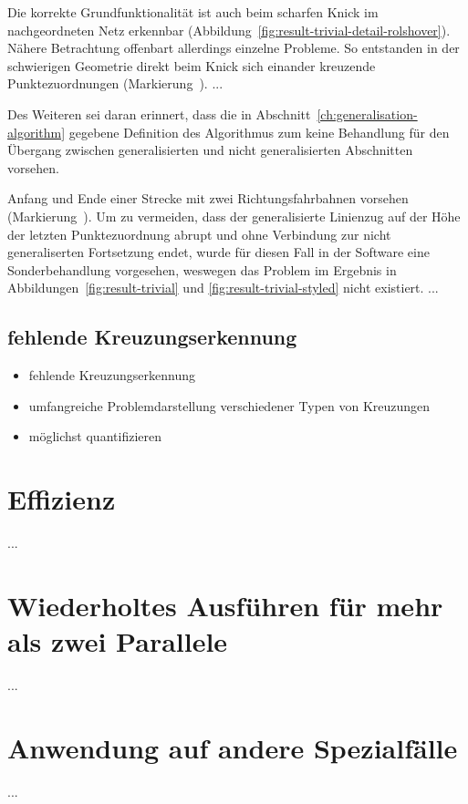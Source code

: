 \documentclass[../main/thesis.tex]{subfiles}
\begin{document}
Die korrekte Grundfunktionalität ist auch beim scharfen Knick im nachgeordneten Netz
erkennbar (Abbildung~\ref{fig:result-trivial-detail-rolshover}).
Nähere Betrachtung offenbart allerdings einzelne Probleme.
So entstanden in der schwierigen Geometrie direkt beim Knick sich einander kreuzende Punktezuordnungen (Markierung~).
...

Des Weiteren sei daran erinnert, dass die in Abschnitt~\ref{ch:generalisation-algorithm} gegebene Definition des Algorithmus zum  keine Behandlung für den Übergang zwischen generalisierten und nicht generalisierten Abschnitten vorsehen.

Anfang und Ende einer Strecke mit zwei Richtungsfahrbahnen vorsehen (Markierung~).
Um zu vermeiden, dass der generalisierte Linienzug auf der Höhe der letzten Punktezuordnung abrupt und ohne Verbindung zur nicht generaliserten Fortsetzung endet, wurde für diesen Fall in der Software eine Sonderbehandlung vorgesehen, weswegen das Problem im Ergebnis in Abbildungen~\ref{fig:result-trivial} und \ref{fig:result-trivial-styled} nicht existiert.
...





\subsection{fehlende Kreuzungserkennung}

\begin{itemize}
\item fehlende Kreuzungserkennung
\item umfangreiche Problemdarstellung verschiedener Typen von Kreuzungen
\item möglichst quantifizieren
\end{itemize}



\section{Effizienz}

...



\section{Wiederholtes Ausführen für mehr als zwei Parallele}

...



\section{Anwendung auf andere Spezialfälle}

...



\end{document}
